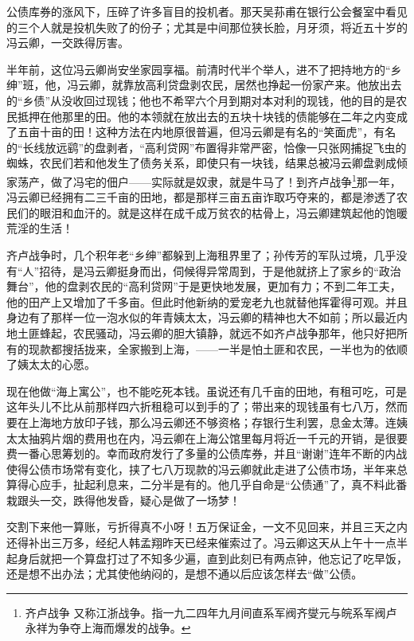 \par 公债库券的涨风下，压碎了许多盲目的投机者。那天吴荪甫在银行公会餐室中看见的三个人就是投机失败了的份子；尤其是中间那位狭长脸，月牙须，将近五十岁的冯云卿，一交跌得厉害。
\par 半年前，这位冯云卿尚安坐家园享福。前清时代半个举人，进不了把持地方的“乡绅”班，他，冯云卿，就靠放高利贷盘剥农民，居然也挣起一份家产来。他放出去的“乡债”从没收回过现钱；他也不希罕六个月到期对本对利的现钱，他的目的是农民抵押在他那里的田。他的本领就在放出去的五块十块钱的债能够在二年之内变成了五亩十亩的田！这种方法在内地原很普遍，但冯云卿是有名的“笑面虎”，有名的“长线放远鹞”的盘剥者，“高利贷网”布置得非常严密，恰像一只张网捕捉飞虫的蜘蛛，农民们若和他发生了债务关系，即使只有一块钱，结果总被冯云卿盘剥成倾家荡产，做了冯宅的佃户——实际就是奴隶，就是牛马了！到齐卢战争\footnote{齐卢战争 又称江浙战争。指一九二四年九月间直系军阀齐燮元与皖系军阀卢永祥为争夺上海而爆发的战争。}那一年，冯云卿已经拥有二三千亩的田地，都是那样三亩五亩诈取巧夺来的，都是渗透了农民们的眼泪和血汗的。就是这样在成千成万贫农的枯骨上，冯云卿建筑起他的饱暖荒淫的生活！
\par 齐卢战争时，几个积年老“乡绅”都躲到上海租界里了；孙传芳的军队过境，几乎没有“人”招待，是冯云卿挺身而出，伺候得异常周到，于是他就挤上了家乡的“政治舞台”，他的盘剥农民的“高利贷网”于是更快地发展，更加有力；不到二年工夫，他的田产上又增加了千多亩。但此时他新纳的爱宠老九也就替他挥霍得可观。并且身边有了那样一位一泡水似的年青姨太太，冯云卿的精神也大不如前；所以最近内地土匪蜂起，农民骚动，冯云卿的胆大镇静，就远不如齐卢战争那年，他只好把所有的现款都搜括拢来，全家搬到上海，——一半是怕土匪和农民，一半也为的依顺了姨太太的心愿。
\par 现在他做“海上寓公”，也不能吃死本钱。虽说还有几千亩的田地，有租可吃，可是这年头儿不比从前那样四六折租稳可以到手的了；带出来的现钱虽有七八万，然而要在上海地方放印子钱，那么冯云卿还不够资格；存银行生利罢，息金太薄。连姨太太抽鸦片烟的费用也在内，冯云卿在上海公馆里每月将近一千元的开销，是很要费一番心思筹划的。幸而政府发行了多量的公债库券，并且“谢谢”连年不断的内战使得公债市场常有变化，挟了七八万现款的冯云卿就此走进了公债市场，半年来总算得心应手，扯起利息来，二分半是有的。他几乎自命是“公债通”了，真不料此番栽跟头一交，跌得他发昏，疑心是做了一场梦！
\par 交割下来他一算账，亏折得真不小呀！五万保证金，一文不见回来，并且三天之内还得补出三万多，经纪人韩孟翔昨天已经来催索过了。冯云卿这天从上午十一点半起身后就把一个算盘打过了不知多少遍，直到此刻已有两点钟，他忘记了吃早饭，还是想不出办法；尤其使他纳闷的，是想不通以后应该怎样去“做”公债。
